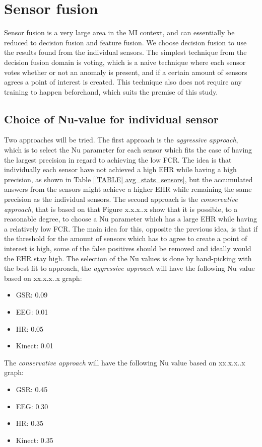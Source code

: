 \section{Sensor fusion}
Sensor fusion is a very large area in the MI context, and can essentially be reduced to decision fusion and feature fusion. 
We choose decision fusion to use the results found from the individual sensors.
The simplest technique from the decision fusion domain is voting, which is a naive technique where each sensor votes whether or not an anomaly is present, and if a certain amount of sensors agrees a point of interest is created. This technique also does not require any training to happen beforehand, which suits the premise of this study.

\subsection{Choice of Nu-value for individual sensor}
Two approaches will be tried. The first approach is the \textit{aggressive approach}, which is to select the Nu parameter for each sensor which fits the case of having the largest precision in regard to achieving the low FCR. The idea is that individually each sensor have not achieved a high EHR while having a high precision, as shown in Table \ref{[TABLE] avg_stats_sensors}, but the accumulated answers from the sensors might achieve a higher EHR while remaining the same precision as the individual sensors.
The second approach is the \textit{conservative approach}, that is based on that Figure x.x.x..x show that it is possible, to a reasonable degree, to choose a Nu parameter which has a large EHR while having a relatively low FCR. The main idea for this, opposite the previous idea, is that if the threshold for the amount of sensors which has to agree to create a point of interest is high, some of the false positives should be removed and ideally would the EHR stay high.
The selection of the Nu values is done by hand-picking with the best fit to approach, the \textit{aggressive approach} will have the following Nu value based on xx.x.x..x graph:
\begin{itemize}
\item GSR: 0.09
\item EEG: 0.01
\item HR: 0.05
\item Kinect: 0.01
\end{itemize}
The \textit{conservative approach} will have the following Nu value based on xx.x.x..x graph:
\begin{itemize}
\item GSR: 0.45
\item EEG: 0.30
\item HR: 0.35
\item Kinect: 0.35
\end{itemize}

